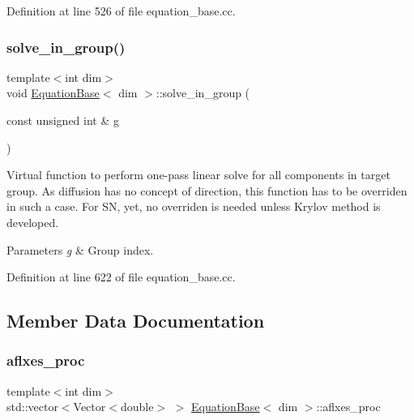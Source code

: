 Definition at line 526 of file equation\+\_\+base.\+cc.

\mbox{\label{class_equation_base_a591282eb0ced01a7f22e29e7f0f44129}} 
\subsubsection{\texorpdfstring{solve\+\_\+in\+\_\+group()}{solve\_in\_group()}}
{\footnotesize\ttfamily template$<$int dim$>$ \\
void \hyperlink{class_equation_base}{Equation\+Base}$<$ dim $>$\+::solve\+\_\+in\+\_\+group (\begin{DoxyParamCaption}\item[{const unsigned int \&}]{g }\end{DoxyParamCaption})\hspace{0.3cm}{\ttfamily [virtual]}}

Virtual function to perform one-\/pass linear solve for all components in target group. As diffusion has no concept of direction, this function has to be overriden in such a case. For SN, yet, no overriden is needed unless Krylov method is developed.


\begin{DoxyParams}{Parameters}
{\em g} & Group index. \\
\hline
\end{DoxyParams}


Definition at line 622 of file equation\+\_\+base.\+cc.



\subsection{Member Data Documentation}
\mbox{\label{class_equation_base_aa5a26770211dc6c8b2c17e35deffa60b}} 
\subsubsection{\texorpdfstring{aflxes\+\_\+proc}{aflxes\_proc}}
{\footnotesize\ttfamily template$<$int dim$>$ \\
std\+::vector$<$Vector$<$double$>$ $>$ \hyperlink{class_equation_base}{Equation\+Base}$<$ dim $>$\+::aflxes\+\_\+proc\hspace{0.3cm}{\ttfamily [private]}}



